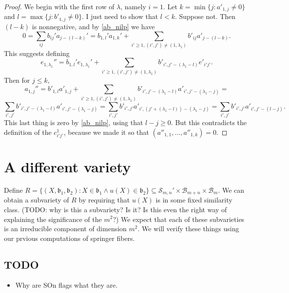 \documentclass[12pt,psamsfonts]{article}
\begin{document}
\begin{proof}
    We begin with the first row of \(\lambda\), namely \(i = 1\).
    Let \(k = \min\{j : a'_{1,j} \neq 0\}\) and \(l = \max\{j : b'_{1, j} \neq 0\}\).
    I just need to show that \(l < k\).
    Suppose not.
    Then \((l - k)\) is nonnegative, and by \cref{ab_nilp} we have 
    \[0 = \sum_{ij} b_{ij}' a_{j - (l - k)}' = b_{1,l}' a_{1,k}' + \sum_{i' \geq 1, (i', j') \neq (1, \lambda_1)} b'_{ij} a'_{j - (l - k)}.\]
    This suggests defining 
    \[e_{1,\lambda_1}'' = b_{1, l}'e_{1, \lambda_1}' + \sum_{i' \geq 1, (i', j') \neq (1, \lambda_1)} b'_{i',j' - (\lambda_1 - l)} e'_{i'j'}.\]
    Then for \(j \leq k\),
    \[a_{1,j}'' = b'_{1, l} a'_{1, j} + \sum_{i' \geq 1, (i', j') \neq (1, \lambda_1)} b'_{i', j' - (\lambda_1 - l)} a'_{i', j' - (\lambda_1 - j)} = \]
    \[\sum_{i', j'} b'_{i', j' - (\lambda_1 - l)} a'_{i', j' - (\lambda_1 - j)} = \sum_{i', j'} b'_{i', j'} a'_{i', (j' + (\lambda_1 - l)) - (\lambda_1 - j)} = \sum_{i',j'} b'_{i',j'} a'_{i', j' - (l - j)}.\]
    This last thing is zero by \cref{ab_nilp}, using that \(l - j \geq 0\).
    But this contradicts the definition of the \(c_{i'j'}^1\), because we made it so that \((a''_{1, 1}, ..., a''_{1, k}) = 0\).
    
\end{proof}

\section{A different variety}
Define \(R = \{(X, \mathfrak{b}_1, \mathfrak{b}_2) : X \in \mathfrak{b}_1 \land u(X) \in \mathfrak{b}_2\} \subseteq \mathcal{S}_{m,n}' \times \mathcal{B}_{m + n} \times \mathcal{B}_m\).
We can obtain a subvariety of \(R\) by requiring that \(u(X)\) is in some fixed similarity class.
(TODO: why is this a subvariety?  Is it?  Is this even the right way of explaining the significance of the \(m^2\)?)
We expect that each of these subvarieties is an irreducible component of dimension \(m^2\).
We will verify these things using our prvious computations of springer fibers.

\subsection{TODO}
\begin{itemize}
    \item Why are SOn flags what they are.
\end{itemize}


\end{document}
